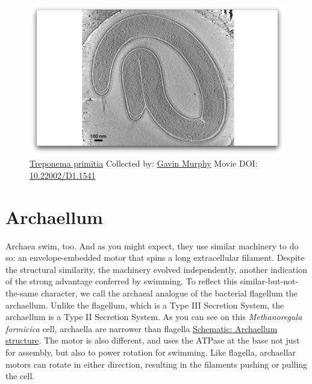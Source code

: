 \documentclass[]{tufte-book}
\begin{document}
\begin{figure}
\includegraphics{movie_stills/6_7a} \caption[\protect\hyperlink{tree}{Treponema primitia} Collected by:
\protect\hyperlink{gavin_murphy}{Gavin Murphy} Movie DOI:
\href{https://doi.org/10.22002/D1.1541}{10.22002/D1.1541}]{\protect\hyperlink{tree}{Treponema primitia} Collected by:
\protect\hyperlink{gavin_murphy}{Gavin Murphy} Movie DOI:
\href{https://doi.org/10.22002/D1.1541}{10.22002/D1.1541}}\label{fig:6-7a}
\end{figure}

\section{Archaellum}\label{archaellum}

Archaea swim, too. And as you might expect, they use similar machinery
to do so: an envelope-embedded motor that spins a long extracellular
filament. Despite the structural similarity, the machinery evolved
independently, another indication of the strong advantage conferred by
swimming. To reflect this similar-but-not-the-same character, we call
the archaeal analogue of the bacterial flagellum the archaellum. Unlike
the flagellum, which is a Type III Secretion System, the archaellum is a
Type II Secretion System. As you can see on this \emph{Methanoregula
formicica} cell, archaella are narrower than flagella
\protect\hyperlink{Archaellum_structure}{Schematic: Archaellum
structure}. The motor is also different, and uses the ATPase at the base
not just for assembly, but also to power rotation for swimming. Like
flagella, archaellar motors can rotate in either direction, resulting in
the filaments pushing or pulling the cell.
\end{document}
